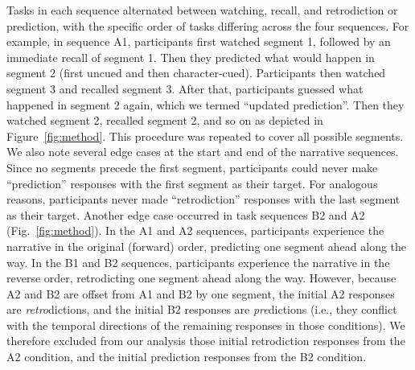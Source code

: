 \documentclass[10pt]{article}
\begin{document}
Tasks in each sequence alternated between watching, recall, and retrodiction or
prediction, with the specific order of tasks differing across the four
sequences. For example, in sequence A1, participants first watched segment 1,
followed by an immediate recall of segment 1. Then they predicted what would
happen in segment 2 (first uncued and then character-cued). Participants then
watched segment 3 and recalled segment 3. After that, participants guessed what
happened in segment 2 again, which we termed ``updated prediction''. Then they
watched segment 2, recalled segment 2, and so on as depicted in
Figure~\ref{fig:method}. This procedure was repeated to cover all possible
segments. We also note several edge cases at the start and end of the narrative
sequences. Since no segments precede the first segment, participants could
never make ``prediction'' responses with the first segment as their target. For
analogous reasons, participants never made ``retrodiction'' responses with the
last segment as their target. Another edge case occurred in task sequences B2
and A2 (Fig.~\ref{fig:method}). In the A1 and A2 sequences, participants
experience the narrative in the original (forward) order, predicting one
segment ahead along the way. In the B1 and B2 sequences, participants
experience the narrative in the reverse order, retrodicting one segment ahead
along the way. However, because A2 and B2 are offset from A1 and B2 by one
segment, the initial A2 responses are \textit{retro}dictions, and the initial
B2 responses are \textit{pre}dictions (i.e., they conflict with the temporal
directions of the remaining responses in those conditions). We therefore
excluded from our analysis those initial retrodiction responses from the A2
condition, and the initial prediction responses from the B2 condition.
\end{document}
